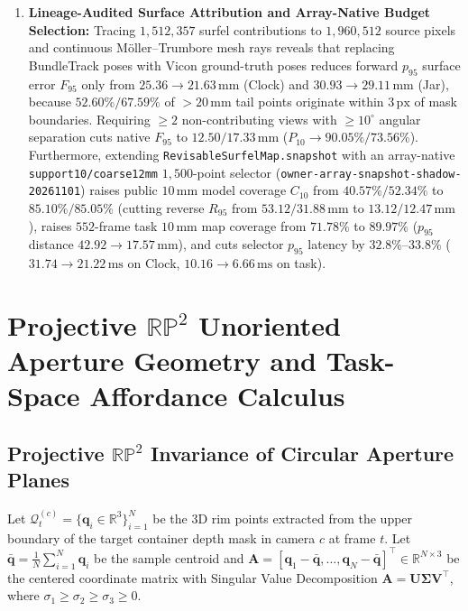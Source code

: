 \documentclass[10pt,journal]{IEEEtran}
\begin{document}
\begin{enumerate}
    \item \textbf{Lineage-Audited Surface Attribution and Array-Native Budget Selection:} Tracing $1{,}512{,}357$ surfel contributions to $1{,}960{,}512$ source pixels and continuous M\"oller--Trumbore mesh rays reveals that replacing BundleTrack poses with Vicon ground-truth poses reduces forward $p_{95}$ surface error $F_{95}$ only from $25.36 \to 21.63\,\mathrm{mm}$ (Clock) and $30.93 \to 29.11\,\mathrm{mm}$ (Jar), because $52.60\% / 67.59\%$ of $>20\,\mathrm{mm}$ tail points originate within $3\,\mathrm{px}$ of mask boundaries. Requiring $\ge 2$ non-contributing views with $\ge 10^\circ$ angular separation cuts native $F_{95}$ to $12.50 / 17.33\,\mathrm{mm}$ ($P_{10} \to 90.05\% / 73.56\%$). Furthermore, extending \texttt{RevisableSurfelMap.snapshot} with an array-native \texttt{support10/coarse12mm} $1{,}500$-point selector (\texttt{owner-array-snapshot-shadow-20261101}) raises public $10\,\mathrm{mm}$ model coverage $C_{10}$ from $40.57\% / 52.34\%$ to $\mathbf{85.10\% / 85.05\%}$ (cutting reverse $R_{95}$ from $53.12 / 31.88\,\mathrm{mm}$ to $13.12 / 12.47\,\mathrm{mm}$), raises $552$-frame task $10\,\mathrm{mm}$ map coverage from $71.78\%$ to $\mathbf{89.97\%}$ ($p_{95}$ distance $42.92 \to 17.57\,\mathrm{mm}$), and cuts selector $p_{95}$ latency by $32.8\%$--$33.8\%$ ($31.74 \to 21.22\,\mathrm{ms}$ on Clock, $10.16 \to 6.66\,\mathrm{ms}$ on task).
\end{enumerate}

\section{Projective $\mathbb{RP}^2$ Unoriented Aperture Geometry and Task-Space Affordance Calculus}
\label{sec:rp2}

\subsection{Projective $\mathbb{RP}^2$ Invariance of Circular Aperture Planes}
Let $\mathcal{Q}_t^{(c)} = \{\mathbf{q}_i \in \mathbb{R}^3\}_{i=1}^N$ be the 3D rim points extracted from the upper boundary of the target container depth mask in camera $c$ at frame $t$. Let $\bar{\mathbf{q}} = \frac{1}{N}\sum_{i=1}^N \mathbf{q}_i$ be the sample centroid and $\mathbf{A} = [\mathbf{q}_1 - \bar{\mathbf{q}}, \dots, \mathbf{q}_N - \bar{\mathbf{q}}]^\top \in \mathbb{R}^{N\times 3}$ be the centered coordinate matrix with Singular Value Decomposition $\mathbf{A} = \mathbf{U}\boldsymbol{\Sigma}\mathbf{V}^\top$, where $\sigma_1 \ge \sigma_2 \ge \sigma_3 \ge 0$.
\end{document}
